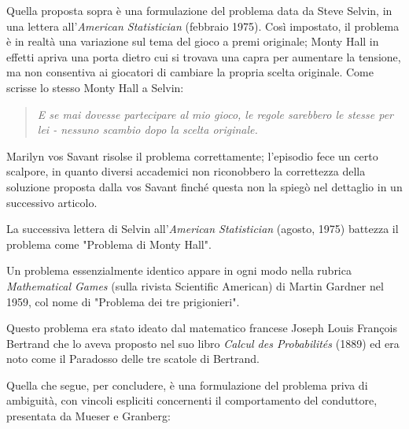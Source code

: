\documentclass[a4paper, 12pt]{report}
\begin{document}
Quella proposta sopra è una formulazione del problema data da Steve Selvin, in una lettera all'\textit{American Statistician} (febbraio 1975). Così impostato, il problema è in realtà una variazione sul tema del gioco a premi originale; Monty Hall in effetti apriva una porta dietro cui si trovava una capra per aumentare la tensione, ma non consentiva ai giocatori di cambiare la propria scelta originale. Come scrisse lo stesso Monty Hall a Selvin:

\begin{quote}
	\textit{E se mai dovesse partecipare al mio gioco, le regole sarebbero le stesse per lei - nessuno scambio dopo la scelta originale.}
\end{quote}

Marilyn vos Savant risolse il problema correttamente; l'episodio fece un certo scalpore, in quanto diversi accademici non riconobbero la correttezza della soluzione proposta dalla vos Savant finché questa non la spiegò nel dettaglio in un successivo articolo.

La successiva lettera di Selvin all'\textit{American Statistician} (agosto, 1975) battezza il problema come "Problema di Monty Hall".

Un problema essenzialmente identico appare in ogni modo nella rubrica \textit{Mathematical Games} (sulla rivista Scientific American) di Martin Gardner nel 1959, col nome di "Problema dei tre prigionieri".

Questo problema era stato ideato dal matematico francese Joseph Louis François Bertrand che lo aveva proposto nel suo libro \textit{Calcul des Probabilités} (1889) ed era noto come il Paradosso delle tre scatole di Bertrand.

Quella che segue, per concludere, è una formulazione del problema priva di ambiguità, con vincoli espliciti concernenti il comportamento del conduttore, presentata da Mueser e Granberg:
\end{document}
